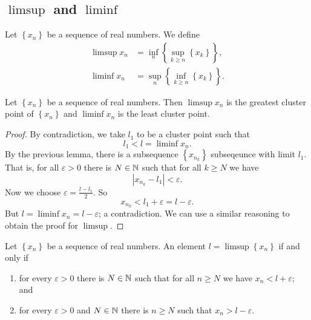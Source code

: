 
\subsection{$\limsup$ and $\liminf$}

\begin{definition}[]
	Let $\left\{ x_n \right\}$ be a sequence of real numbers.
	We define
	\begin{align*}
		\limsup x_n 
		&= \inf_n\left\{ \sup_{k \geq n} \left\{ x_k \right\} \right\}, \\
		\liminf x_n 
		&= \sup_n\left\{ \inf_{k \geq n} \left\{ x_k \right\} \right\}.
	\end{align*}
\end{definition}

\begin{proposition}[]
	Let $\left\{ x_n \right\}$ be a sequence of real numbers.
	Then $\limsup x_n$ is the greatest cluster point of $\left\{ x_n \right\}$
	and $\liminf x_n$ is the least cluster point.
\end{proposition}

\begin{proof}
	By contradiction, we take $l_1$ to be a cluster point such that \[
		l_1 < l = \liminf x_n.
	\]
	By the previous lemma, there is a subsequence $\left\{ x_{n_k} \right\}$
	subseqeunce with limit $l_1$.
	That is, for all $\varepsilon > 0$ there is $N \in \mathbb{N}$ such that for all
	$k \geq N$ we have \[
		\left\lvert x_{n_k} - l_1 \right\rvert < \varepsilon.
	\]
	Now we choose $\varepsilon = \frac{l - l_1}{2}$. So \[
		x_{n_k} < l_1 + \varepsilon = l - \varepsilon.
	\]
	But $l = \liminf x_n = l - \varepsilon$; a contradiction.
	We can use a similar reasoning to obtain the proof for $\limsup$.
\end{proof}

\begin{proposition}[]
	Let $\left\{ x_n \right\}$ be a sequence of real numbers.
	An element $l = \limsup\left\{ x_n \right\}$ if and only if
	\begin{enumerate}
		\item for every $\varepsilon > 0$ there is $N \in \mathbb{N}$
			such that for all $n \geq N$ we have $x_n < l + \varepsilon$; and
		\item for every $\varepsilon > 0$ and $N \in \mathbb{N}$ there is $n \geq N$
			such that $x_n > l - \varepsilon$.
	\end{enumerate}
\end{proposition}

